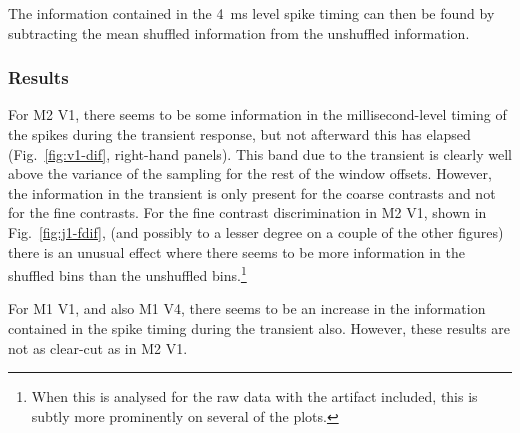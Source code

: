 The information contained in the \SI{4}{ms} level spike timing can then be found by subtracting the mean shuffled information from the unshuffled information.


\subsubsection{Results}

For \ac{M2} \ac{V1}, there seems to be some information in the millisecond-level timing of the spikes during the transient response, but not afterward this has elapsed (Fig.~\ref{fig:v1-dif}, right-hand panels).
This band due to the transient is clearly well above the variance of the sampling for the rest of the window offsets.
However, the information in the transient is only present for the coarse contrasts and not for the fine contrasts.
For the fine contrast discrimination in \ac{M2} \ac{V1}, shown in Fig.~\ref{fig:j1-fdif}, (and possibly to a lesser degree on a couple of the other figures) there is an unusual effect where there seems to be more information in the shuffled bins than the unshuffled bins.\footnote{When this is analysed for the raw data with the artifact included, this is subtly more prominently on several of the plots.}

For \ac{M1} \ac{V1}, and also \ac{M1} \ac{V4}, there seems to be an increase in the information contained in the spike timing during the transient also.
However, these results are not as clear-cut as in \ac{M2} \ac{V1}.

% 

